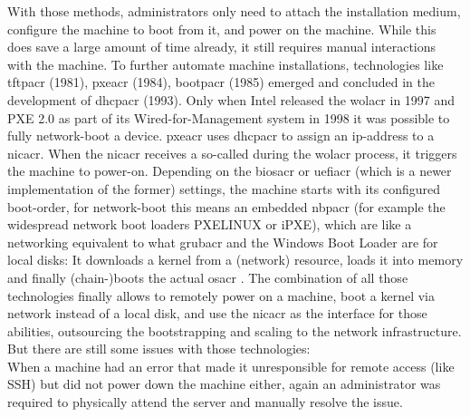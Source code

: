 \newline
With those methods, administrators only need to attach the installation medium, configure the machine to boot from it, and power on the machine. While this does save a large amount of time already, it still requires manual interactions with the machine.
\newline
To further automate machine installations, technologies like \gls{tftpacr} (1981), \gls{pxeacr} (1984), \gls{bootpacr} (1985) emerged and concluded in the development of \gls{dhcpacr} (1993). Only when Intel released the \gls{wolacr} in 1997 and PXE 2.0 as part of its Wired-for-Management system in 1998 it was possible to fully network-boot a device.
\newline
\Gls{pxeacr} uses \gls{dhcpacr} to assign an ip-address to a \gls{nicacr}. When the \gls{nicacr} receives a so-called  during the \gls{wolacr} process, it triggers the machine to power-on. Depending on the \gls{biosacr} or \gls{uefiacr} (which is a newer implementation of the former) settings, the machine starts with its configured boot-order, for network-boot this means an embedded \gls{nbpacr} (for example the widespread network boot loaders PXELINUX or iPXE), which are like a networking equivalent to what \gls{grubacr} and the Windows Boot Loader are for local disks: It downloads a kernel from a (network) resource, loads it into memory and finally (chain-)boots the actual \gls{osacr} \cite{preboot_execution_environment} \cite{understanding_bare_metal_service}.
\newline
The combination of all those technologies finally allows to remotely power on a machine, boot a kernel via network instead of a local disk, and use the \gls{nicacr} as the interface for those abilities, outsourcing the bootstrapping and scaling to the network infrastructure.
\newline
But there are still some issues with those technologies: \\
When a machine had an error that made it unresponsible for remote access (like SSH) but did not power down the machine either, again an administrator was required to physically attend the server and manually resolve the issue.
\newline
